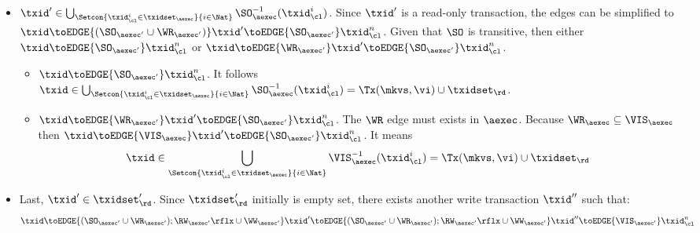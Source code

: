 \begin{itemize}
\begin{itemize}
\begin{itemize}
        By the invariant \( I_1 \), it means \( \txid \in \Tx(\mkvs, \vi) \cup \txidset_\rd \).
    \item \( \txid' \in \bigcup_{\Setcon{\txid_{\cl}^{i} \in \txidset_{\aexec} }{ i \in \Nat }} \SO_{\aexec}^{-1}(\txid^i_\cl) \).
    Since \( \txid' \) is a read-only transaction, 
    the edges can be simplified to \( \txid \toEDGE{(\SO_{\aexec'} \cup \WR_{\aexec'} )} \txid' \toEDGE{\SO_{\aexec'}}  \txid_\cl^n \).
    Given that \( \SO \) is transitive, then  either \( \txid \toEDGE{\SO_{\aexec'}} \txid_\cl^n \) or \( \txid \toEDGE{\WR_{\aexec'} } \txid' \toEDGE{\SO_{\aexec'}}  \txid_\cl^n \).
    \begin{itemize}
        \item \( \txid \toEDGE{\SO_{\aexec'}} \txid_\cl^n \).
            It follows \( \txid \in \bigcup_{\Setcon{\txid_{\cl}^{i} \in \txidset_{\aexec} }{ i \in \Nat }} \SO_{\aexec}^{-1}(\txid^i_\cl) = \Tx(\mkvs, \vi) \cup \txidset_\rd \).
        \item \( \txid \toEDGE{\WR_{\aexec'} } \txid' \toEDGE{\SO_{\aexec'}}  \txid_\cl^n \).
            The \( \WR \) edge must exists in \( \aexec \).
            Because \( \WR_\aexec \subseteq \VIS_\aexec \) then  \( \txid \toEDGE{\VIS_{\aexec} } \txid' \toEDGE{\SO_{\aexec'}}  \txid_\cl^n  \).
            It means 
            \[ 
                \txid \in \bigcup_{\Setcon{\txid_{\cl}^{i} \in \txidset_{\aexec} }{ i \in \Nat }} \VIS_{\aexec}^{-1}(\txid^i_\cl) = \Tx(\mkvs, \vi) \cup \txidset_\rd 
            \]
    \end{itemize}
    \item 
    Last, \( \txid' \in \txidset'_\rd \).
    Since \( \txidset'_\rd \) initially is empty set, there exists another write transaction \( \txid'' \) such that:
    \[
        \txid \toEDGE{(\SO_{\aexec'} \cup \WR_{\aexec'} ) ; \RW_{\aexec'}\rflx \cup \WW_{\aexec'}} \txid' \toEDGE{(\SO_{\aexec'} \cup \WR_{\aexec'} ) ; \RW_{\aexec'}\rflx \cup \WW_{\aexec'}} \txid'' \toEDGE{\VIS_{\aexec'}}  \txid_\cl^n
    \]

\end{itemize}
\end{itemize}
\end{itemize}
